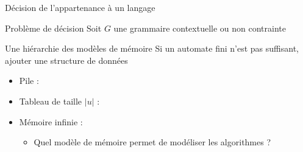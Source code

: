 
\begingroup

\begin{frame}{Décision de l'appartenance à un langage}

  \begin{block}{Problème de décision}
    Soit $G$ une grammaire contextuelle ou non contrainte 
    
  \end{block}

  \begin{block}{Une hiérarchie des modèles de mémoire}
    Si un automate fini n'est pas suffisant, ajouter une structure de données
    \begin{itemize}
    \item Pile : 
    \item Tableau de taille $|u|$ : 
    \item Mémoire infinie : 
    \begin{itemize}
    \item Quel modèle de mémoire permet de modéliser les algorithmes ? 
    \end{itemize}
    \end{itemize}
  \end{block}
  
\end{frame}

\endgroup
\endinput
